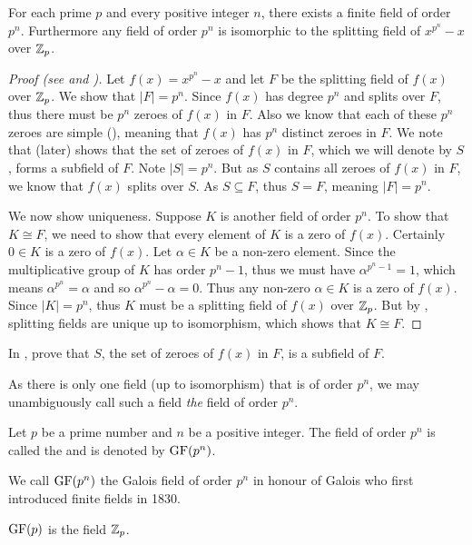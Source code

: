 \begin{theorem}\label{thrm-finite-field-is-unique}
    For each prime $p$ and every positive integer $n$, there exists a finite field of order $p^n$. Furthermore any field of order $p^n$ is isomorphic to the splitting field of $x^{p^n} - x$ over $\mathbb{Z}_p$.
\end{theorem}
\begin{proof}[Proof (see {\cite[Theorem 22.1]{gallian_2016}} and {\cite[Theorem 22.6]{judson_beezer_2022}})]
    Let $f(x) = x^{p^n} - x$ and let $F$ be the splitting field of $f(x)$ over $\mathbb{Z}_p$. We show that $|F| = p^n$. Since $f(x)$ has degree $p^n$ and splits over $F$, thus there must be $p^n$ zeroes of $f(x)$ in $F$. Also we know that each of these $p^n$ zeroes are simple (), meaning that $f(x)$ has $p^n$ distinct zeroes in $F$. We note that  (later) shows that the set of zeroes of $f(x)$ in $F$, which we will denote by $S$, forms a subfield of $F$. Note $|S| = p^n$. But as $S$ contains all zeroes of $f(x)$ in $F$, we know that $f(x)$ splits over $S$. As $S \subseteq F$, thus $S = F$, meaning $|F| = p^n$.

    We now show uniqueness. Suppose $K$ is another field of order $p^n$. To show that $K \cong F$, we need to show that every element of $K$ is a zero of $f(x)$. Certainly $0 \in K$ is a zero of $f(x)$. Let $\alpha \in K$ be a non-zero element. Since the multiplicative group of $K$ has order $p^n - 1$, thus we must have $\alpha^{p^n-1} = 1$, which means $\alpha^{p^n} = \alpha$ and so $\alpha^{p^n}-\alpha = 0$. Thus any non-zero $\alpha \in K$ is a zero of $f(x)$. Since $|K| = p^n$, thus $K$ must be a splitting field of $f(x)$ over $\mathbb{Z}_p$. But by , splitting fields are unique up to isomorphism, which shows that $K \cong F$.
\end{proof}

\begin{exercise}\label{exercise-zeroes-of-polynomial-form-subfield}
    In , prove that $S$, the set of zeroes of $f(x)$ in $F$, is a subfield of $F$.
\end{exercise}

As there is only one field (up to isomorphism) that is of order $p^n$, we may unambiguously call such a field \textit{the} field of order $p^n$.

\begin{definition}
    Let $p$ be a prime number and $n$ be a positive integer. The field of order $p^n$ is called the  and is denoted by $\mathrm{GF}(p^n)$.
\end{definition}
\begin{remark}
    We call $\mathrm{GF}(p^n)$ the Galois field of order $p^n$ in honour of Galois who first introduced finite fields in 1830.
\end{remark}
\begin{remark}
    $\mathrm{GF}(p)$ is the field $\mathbb{Z}_p$.
\end{remark}

